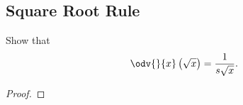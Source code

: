 \subsection{Square Root Rule}

Show that
\[%
  \odv{}{x}\left(\sqrt{x}\right) = \frac{1}{s\sqrt{x}}
.\]%

\begin{proof}
\end{proof}
